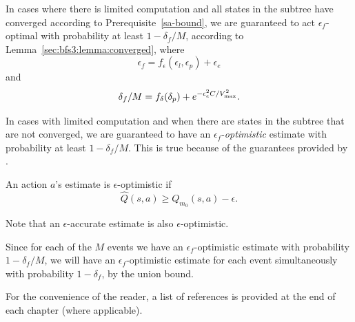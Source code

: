 In cases where there is limited computation and all states in the subtree have converged according to Prerequisite~\ref{sa-bound}, we are guaranteed to act $\epsilon_f$-optimal with probability  at least $1 - \delta_f/M$, according to Lemma~\ref{sec:bfs3:lemma:converged}, where
$$\epsilon_f = f_\epsilon(\epsilon_l, \epsilon_p)+\epsilon_e$$
and
$$\delta_f/M = f_\delta(\delta_{p}) + e^{-\epsilon_e^2 C / {V_{\rm max}^2}}.$$

In cases with limited computation and when there are states in the subtree that are not converged, we are guaranteed to have an $\epsilon_f$-\emph{optimistic} estimate with probability  at least $1-\delta_f/M$. This is true because of the guarantees provided by .

An action $a$'s estimate is $\epsilon$-optimistic if
$$\hat Q(s, a) \geq Q_{m_0}(s, a) - \epsilon.$$

Note that an $\epsilon$-accurate estimate is also $\epsilon$-optimistic.

Since for each of the $M$ events we have an $\epsilon_f$-optimistic estimate with probability  $1-\delta_f/M$, we will have an $\epsilon_f$-optimistic estimate for each event simultaneously with probability  $1-\delta_f$, by the union bound.



%
\ifperchapterbib%
For the convenience of the reader, a list of references is provided at the end of each chapter (where applicable).
\ifendbib%
\else\fi%
\else\fi%
